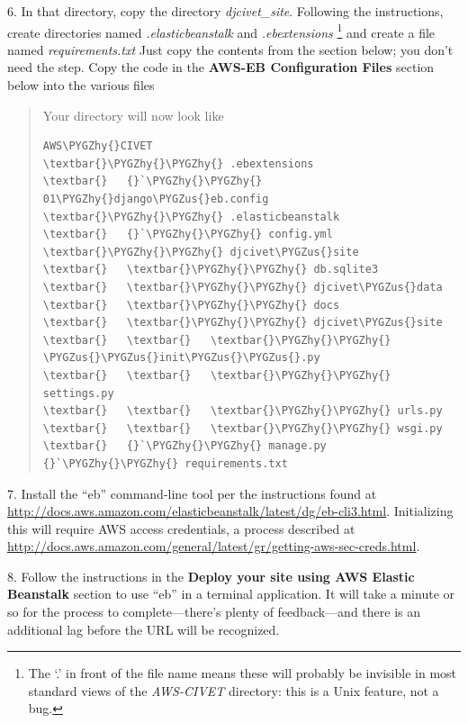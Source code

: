 \documentclass[letterpaper,10pt,english]{sphinxmanual}
\def\PYGZus{\char`\_}
\def\PYGZhy{\char`\-}
\begin{document}
6. In that directory, copy the directory \emph{djcivet\_site}. Following the instructions, create directories named \emph{.elasticbeanstalk}
and \emph{.ebextensions} \footnote{
The ‘.’ in front of the file name means these will probably be invisible in most standard views of the \emph{AWS-CIVET}
directory: this is a Unix feature, not a bug.
}
and create a file named \emph{requirements.txt} Just copy the contents from the section below; you don't need the 
step. Copy the code in the \textbf{AWS-EB Configuration Files} section below into the various files
\begin{quote}

Your directory will now look like

\begin{Verbatim}[commandchars=\\\{\}]
AWS\PYGZhy{}CIVET
\textbar{}\PYGZhy{}\PYGZhy{} .ebextensions
\textbar{}   {}`\PYGZhy{}\PYGZhy{} 01\PYGZhy{}django\PYGZus{}eb.config
\textbar{}\PYGZhy{}\PYGZhy{} .elasticbeanstalk
\textbar{}   {}`\PYGZhy{}\PYGZhy{} config.yml
\textbar{}\PYGZhy{}\PYGZhy{} djcivet\PYGZus{}site
\textbar{}   \textbar{}\PYGZhy{}\PYGZhy{} db.sqlite3
\textbar{}   \textbar{}\PYGZhy{}\PYGZhy{} djcivet\PYGZus{}data
\textbar{}   \textbar{}\PYGZhy{}\PYGZhy{} docs
\textbar{}   \textbar{}\PYGZhy{}\PYGZhy{} djcivet\PYGZus{}site
\textbar{}   \textbar{}   \textbar{}\PYGZhy{}\PYGZhy{} \PYGZus{}\PYGZus{}init\PYGZus{}\PYGZus{}.py
\textbar{}   \textbar{}   \textbar{}\PYGZhy{}\PYGZhy{} settings.py
\textbar{}   \textbar{}   \textbar{}\PYGZhy{}\PYGZhy{} urls.py
\textbar{}   \textbar{}   \textbar{}\PYGZhy{}\PYGZhy{} wsgi.py
\textbar{}   {}`\PYGZhy{}\PYGZhy{} manage.py
{}`\PYGZhy{}\PYGZhy{} requirements.txt
\end{Verbatim}
\end{quote}

7. Install the “eb” command-line tool per the instructions found at
\href{http://docs.aws.amazon.com/elasticbeanstalk/latest/dg/eb-cli3.html}{http://docs.aws.amazon.com/elasticbeanstalk/latest/dg/eb-cli3.html}. Initializing this will require AWS access credentials, a
process described at \href{http://docs.aws.amazon.com/general/latest/gr/getting-aws-sec-creds.html}{http://docs.aws.amazon.com/general/latest/gr/getting-aws-sec-creds.html}.

8. Follow the instructions in the \textbf{Deploy your site using AWS Elastic Beanstalk} section to use “eb” in a terminal
application. It will take a minute or so for the  process to complete—there's plenty of feedback—and there is an
additional lag before the URL will be recognized.
\end{document}
